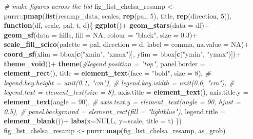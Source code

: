 \documentclass[]{article}
\newenvironment{Shaded}{}{}
\newcommand{\CommentTok}[1]{\textcolor[rgb]{0.38,0.63,0.69}{\textit{#1}}}
\newcommand{\ControlFlowTok}[1]{\textcolor[rgb]{0.00,0.44,0.13}{\textbf{#1}}}
\newcommand{\DataTypeTok}[1]{\textcolor[rgb]{0.56,0.13,0.00}{#1}}
\newcommand{\DecValTok}[1]{\textcolor[rgb]{0.25,0.63,0.44}{#1}}
\newcommand{\FloatTok}[1]{\textcolor[rgb]{0.25,0.63,0.44}{#1}}
\newcommand{\KeywordTok}[1]{\textcolor[rgb]{0.00,0.44,0.13}{\textbf{#1}}}
\newcommand{\NormalTok}[1]{#1}
\newcommand{\OperatorTok}[1]{\textcolor[rgb]{0.40,0.40,0.40}{#1}}
\newcommand{\OtherTok}[1]{\textcolor[rgb]{0.00,0.44,0.13}{#1}}
\newcommand{\StringTok}[1]{\textcolor[rgb]{0.25,0.44,0.63}{#1}}
\begin{document}
\begin{Shaded}
\begin{Highlighting}[]
\CommentTok{# make figures across the list}
\NormalTok{fig_list_chelsa_resamp <-}\StringTok{ }
\StringTok{  }\NormalTok{purrr}\OperatorTok{::}\KeywordTok{pmap}\NormalTok{(}\KeywordTok{list}\NormalTok{(resamp_data, scales, }\KeywordTok{rep}\NormalTok{(pal, }\DecValTok{5}\NormalTok{), title, }\KeywordTok{rep}\NormalTok{(direction, }\DecValTok{5}\NormalTok{)), }
              \ControlFlowTok{function}\NormalTok{(df, scale, pal, t, d)\{}
                \KeywordTok{ggplot}\NormalTok{()}\OperatorTok{+}
\StringTok{                  }\KeywordTok{geom_stars}\NormalTok{(}\DataTypeTok{data =}\NormalTok{ df)}\OperatorTok{+}
\StringTok{                  }\KeywordTok{geom_sf}\NormalTok{(}\DataTypeTok{data =}\NormalTok{ hills, }\DataTypeTok{fill =} \OtherTok{NA}\NormalTok{, }\DataTypeTok{colour =} \StringTok{"black"}\NormalTok{, }\DataTypeTok{size =} \FloatTok{0.3}\NormalTok{)}\OperatorTok{+}
\StringTok{                  }\KeywordTok{scale_fill_scico}\NormalTok{(}\DataTypeTok{palette =}\NormalTok{ pal, }\DataTypeTok{direction =}\NormalTok{ d,}
                                   \DataTypeTok{label =}\NormalTok{ comma, }\DataTypeTok{na.value =} \OtherTok{NA}\NormalTok{)}\OperatorTok{+}
\StringTok{                  }\KeywordTok{coord_sf}\NormalTok{(}\DataTypeTok{xlim =}\NormalTok{ bbox[}\KeywordTok{c}\NormalTok{(}\StringTok{"xmin"}\NormalTok{, }\StringTok{"xmax"}\NormalTok{)],}
                           \DataTypeTok{ylim =}\NormalTok{ bbox[}\KeywordTok{c}\NormalTok{(}\StringTok{"ymin"}\NormalTok{, }\StringTok{"ymax"}\NormalTok{)])}\OperatorTok{+}
\StringTok{                  }\KeywordTok{theme_void}\NormalTok{()}\OperatorTok{+}
\StringTok{                  }\KeywordTok{theme}\NormalTok{(}\CommentTok{#legend.position = "top",}
                    \DataTypeTok{panel.border =} \KeywordTok{element_rect}\NormalTok{(),}
                        \DataTypeTok{title =} \KeywordTok{element_text}\NormalTok{(}\DataTypeTok{face =} \StringTok{"bold"}\NormalTok{, }\DataTypeTok{size =} \DecValTok{8}\NormalTok{),}
                        \CommentTok{# legend.key.height = unit(0.1, "cm"),}
                        \CommentTok{# legend.key.width = unit(0.6, "cm"),}
                        \CommentTok{# legend.text = element_text(size = 8),}
                        \DataTypeTok{axis.title =} \KeywordTok{element_text}\NormalTok{(),}
                        \DataTypeTok{axis.title.y =} \KeywordTok{element_text}\NormalTok{(}\DataTypeTok{angle =} \DecValTok{90}\NormalTok{),}
                        \CommentTok{# axis.text.y = element_text(angle = 90, hjust = 0.5),}
                        \CommentTok{# panel.background = element_rect(fill = "lightblue"),}
                        \DataTypeTok{legend.title =} \KeywordTok{element_blank}\NormalTok{())}\OperatorTok{+}
\StringTok{                  }\KeywordTok{labs}\NormalTok{(}\DataTypeTok{x=}\OtherTok{NULL}\NormalTok{, }\DataTypeTok{y=}\NormalTok{scale, }\DataTypeTok{title =}\NormalTok{ t)}
\NormalTok{              \})}
\NormalTok{fig_list_chelsa_resamp <-}\StringTok{ }\NormalTok{purrr}\OperatorTok{::}\KeywordTok{map}\NormalTok{(fig_list_chelsa_resamp, as_grob)}


\end{Highlighting}
\end{Shaded}
\end{document}
